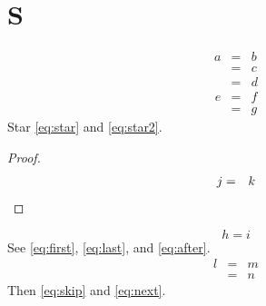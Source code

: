 \documentclass[11pt]{article}
\begin{document}
\section{S}
\begin{eqnarray}
a & = & b \label{eq:first} \\
  & = & c \nonumber \\
  & = & d \label{eq:last}
\end{eqnarray}
\begin{eqnarray*}
e & = & f \label{eq:star} \\
  & = & g \label{eq:star2}
\end{eqnarray*}
Star \ref{eq:star} and \ref{eq:star2}.
\begin{proof}
\begin{eqnarray}
j & = & k \qedhere
\end{eqnarray}
\end{proof}
\begin{equation} h = i \label{eq:after} \end{equation}
See \ref{eq:first}, \ref{eq:last}, and \ref{eq:after}.
\begin{eqnarray}
l & = & m \nonumber \label{eq:skip} \\
  & = & n \label{eq:next}
\end{eqnarray}
Then \ref{eq:skip} and \ref{eq:next}.
\end{document}
